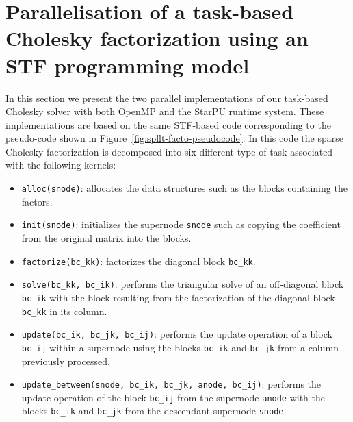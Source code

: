 \documentclass{article}
\begin{document}
\section{Parallelisation of a task-based Cholesky factorization using an STF programming model}
\label{sec:experiments}

In this section we present the two parallel implementations of our
task-based Cholesky solver with both OpenMP and the StarPU runtime
system. These implementations are based on the same STF-based code
corresponding to the pseudo-code shown in
Figure~\ref{fig:spllt-facto-pseudocode}. In this code the sparse
Cholesky factorization is decomposed into six different type of task
associated with the following kernels:

\begin{itemize}
\item \texttt{alloc(snode)}: allocates the data structures
  such as the blocks containing the factors.
\item \texttt{init(snode)}: initializes the supernode \texttt{snode}
  such as copying the coefficient from the original matrix into the
  blocks.
\item \texttt{factorize(bc\_kk)}: factorizes the diagonal block \texttt{bc\_kk}. %
\item \texttt{solve(bc\_kk, bc\_ik)}: performs the triangular solve of
  an off-diagonal block \texttt{bc\_ik} with the block resulting from
  the factorization of the diagonal block \texttt{bc\_kk} in its
  column.
\item \texttt{update(bc\_ik, bc\_jk, bc\_ij)}: performs the update
  operation of a block \texttt{bc\_ij} within a supernode using the
  blocks \texttt{bc\_ik} and \texttt{bc\_jk} from a column previously
  processed.
\item \texttt{update\_between(snode, bc\_ik, bc\_jk, anode, bc\_ij)}:
  performs the update operation of the block \texttt{bc\_ij} from the
  supernode \texttt{anode} with the blocks \texttt{bc\_ik} and
  \texttt{bc\_jk} from the descendant supernode \texttt{snode}.
\end{itemize}
\end{document}
